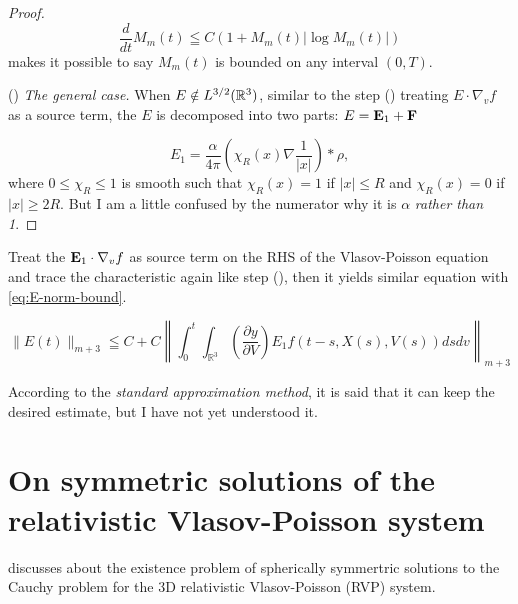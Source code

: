 \begin{proof}
\begin{equation}\frac{d}{d t} M_{m}(t) \leqq C\left(1+M_{m}(t)\left|\log M_{m}(t)\right|\right)\end{equation}
makes it possible to say $M_{m}(t)$ is bounded on any interval $(0,T)$.

() \textit{The general case.}
When $E\notin L^{3/2}({\mathbb{R}}^{3})$, similar to the step () treating $E\cdot \nabla_v f$ as a source term, the $E$ is decomposed into two parts: $E=\mathbf{E}_1+\mathbf{F}$

\begin{equation}
E_{1}=\frac{\alpha}{4 \pi}\left(\chi_{R}(x) \nabla \frac{1}{|x|}\right) * \rho,
\end{equation}where $0 \leq \chi_R\leq 1$ is smooth such that $\chi_R(x) = 1 $ if $|x|\leq R$ and $\chi_R(x)=0$ if $|x|\geq 2R$. But I am a little confused by the numerator why it is $\alpha$ \emph{rather than 1}.
\end{proof}

Treat the $\mathbf{E}_1  \cdot \nabla_v f$ as source term on the RHS of the Vlasov-Poisson equation and trace the characteristic again like step (), then it yields similar equation with \eqref{eq:E-norm-bound}.

\begin{equation}\|E(t)\|_{m+3} \leqq C+C\left\|\int_{0}^{t} \int_{\mathbb{R}^{3}}\left(\frac{\partial y}{\partial V}\right) E_{1} f(t-s, X(s), V(s)) d s d v\right\|_{m+3}\end{equation}

According to the \emph{standard approximation method}, it is said that it can keep the desired estimate, but I have not yet understood it.

\section*{On symmetric solutions of the relativistic Vlasov-Poisson system}






\cite{glassey_symmetric_1985} discusses about the existence problem of spherically symmertric solutions to the Cauchy problem for the 3D relativistic Vlasov-Poisson (RVP) system.


